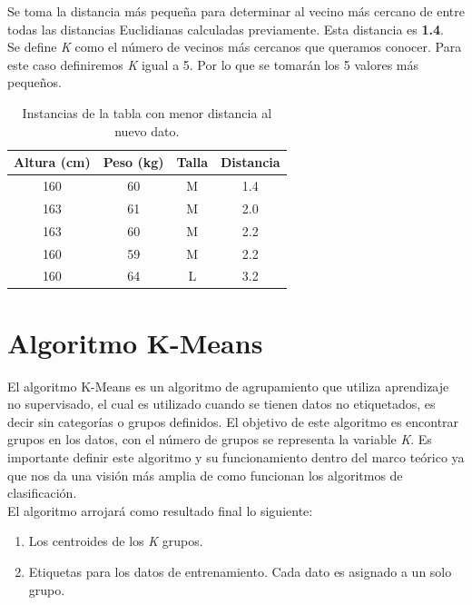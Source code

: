 \begin{UClist}
	\UCli Se toma la distancia más pequeña para determinar al vecino más cercano de entre todas las distancias Euclidianas calculadas previamente. Esta distancia es \textbf{1.4}.\\

	\UCli Se define \emph{K} como el número de vecinos más cercanos que queramos conocer. Para este caso definiremos \emph{K} igual a 5. Por lo que se tomarán los 5 valores más pequeños.\\

	\begin{table}[H]
		\begin{center}
			\label{tab:tablaKNNDistanciasMinimas}
			\begin{tabular}{c|c|c|c}
				\textbf{Altura (cm)} & \textbf{Peso (kg)} & \textbf{Talla} & \textbf{Distancia}\\
				\hline
				160 & 60 & M & 1.4\\
				163 & 61 & M & 2.0\\
				163 & 60 & M & 2.2\\
				160 & 59 & M & 2.2\\
				160 & 64 & L & 3.2\\
			\end{tabular}
		\end{center}
		\caption{Instancias de la tabla con menor distancia al nuevo dato.}
	\end{table}

\end{UClist}

\section{Algoritmo K-Means}
El algoritmo K-Means es un algoritmo de agrupamiento que utiliza aprendizaje no supervisado, el cual es utilizado cuando se tienen datos no etiquetados, es decir sin categorías o grupos definidos. El objetivo de este algoritmo es encontrar grupos en los datos, con el número de grupos se representa la variable \emph{K}\cite{KMeans}. Es importante definir este algoritmo y su funcionamiento dentro del marco teórico ya que nos da una visión más amplia de como funcionan los algoritmos de clasificación.\\

El algoritmo arrojará como resultado final lo siguiente:\\

\begin{enumerate}
	\item Los centroides de los \emph{K} grupos.\\
	\item Etiquetas para los datos de entrenamiento. Cada dato es asignado a un solo grupo.\\
\end{enumerate}

